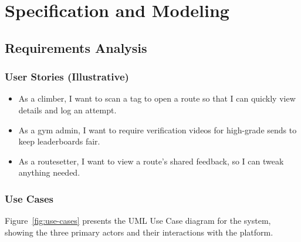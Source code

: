 \documentclass[12pt,a4paper]{report}
\renewcommand\_{\textunderscore\hspace{0pt}}
\begin{document}
\chapter{Specification and Modeling}

\section{Requirements Analysis \cite{Somm15}}

\subsection{User Stories (Illustrative)}

\begin{itemize}[noitemsep]
    \item As a climber, I want to scan a tag to open a route so that I can quickly view details and log an attempt.
    \item As a gym admin, I want to require verification videos for high-grade sends to keep leaderboards fair.
    \item As a routesetter, I want to view a route's shared feedback, so I can tweak anything needed.
\end{itemize}

\subsection{Use Cases}

Figure~\ref{fig:use-cases} presents the UML Use Case diagram for the system, showing the three primary actors and their interactions with the platform.
\end{document}
